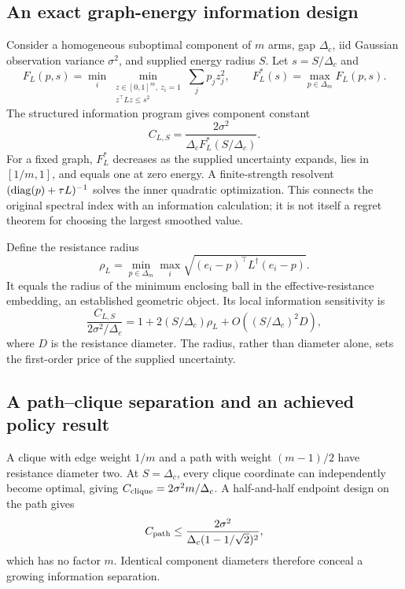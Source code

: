 \subsection{An exact graph-energy information design}
Consider a homogeneous suboptimal component of $m$ arms, gap $\Delta_c$, iid Gaussian observation variance $\sigma^2$, and supplied energy radius $S$. Let $s=S/\Delta_c$ and
\begin{equation}
F_L(p,s)=\min_i\min_{\substack{z\in[0,1]^m,\ z_i=1\\z^\top Lz\le s^2}}\sum_jp_jz_j^2,
\qquad F_L^*(s)=\max_{p\in\Delta_m}F_L(p,s).
\end{equation}
The structured information program gives component constant
\begin{equation}
C_{L,S}=\frac{2\sigma^2}{\Delta_cF_L^*(S/\Delta_c)}.
\end{equation}
For a fixed graph, $F_L^*$ decreases as the supplied uncertainty expands, lies in $[1/m,1]$, and equals one at zero energy. A finite-strength resolvent $(\operatorname{diag}(p)+\tau L)^{-1}$ solves the inner quadratic optimization. This connects the original spectral index with an information calculation; it is not itself a regret theorem for choosing the largest smoothed value.

Define the resistance radius
\begin{equation}
\rho_L=\min_{p\in\Delta_m}\max_i\sqrt{(e_i-p)^\top L^\dagger(e_i-p)}.
\end{equation}
It equals the radius of the minimum enclosing ball in the effective-resistance embedding, an established geometric object. Its local information sensitivity is
\begin{equation}
\frac{C_{L,S}}{2\sigma^2/\Delta_c}
=1+2(S/\Delta_c)\rho_L+O((S/\Delta_c)^2D),
\end{equation}
where $D$ is the resistance diameter. The radius, rather than diameter alone, sets the first-order price of the supplied uncertainty.

\subsection{A path--clique separation and an achieved policy result}
A clique with edge weight $1/m$ and a path with weight $(m-1)/2$ have resistance diameter two. At $S=\Delta_c$, every clique coordinate can independently become optimal, giving $C_{\rm clique}=2\sigma^2m/\Delta_c$. A half-and-half endpoint design on the path gives
\begin{equation}
C_{\rm path}\le\frac{2\sigma^2}{\Delta_c(1-1/\sqrt2)^2},
\end{equation}
which has no factor $m$. Identical component diameters therefore conceal a growing information separation.

